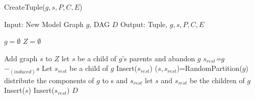 

\begin{algorithm}
\caption{CreateTuple($g,s,P,C,E$)} 
\label{alg:alg102}
\begin{algorithmic}
\STATE Input: New Model Graph $g$, DAG $D$
\STATE Output: Tuple, $g,s,P,C,E$
\end{algorithmic}
\begin{algorithmic}[1]
\STATE $g = \emptyset$
\STATE $Z= \emptyset$

\STATE Add graph $s$ to $Z$ 
\ENDIF
\ENDFOR
{} 
\STATE let $s$ be a child of $g$'s parents and abandon $g$
\RETURN
\ELSE
{}
\STATE \emph{$s_{rest}$=$g$ $-_{(induced)} s$}
\STATE Let \emph{$s_{rest}$} be a child of \emph{$g$}
\STATE Insert($s_{rest}$)
\RETURN
\ENDIF
\ENDFOR
\ENDIF
\ENDWHILE
{}
\STATE ($s,s_{rest}$)=RandomPartition($g$)
\ELSE
\STATE distribute the components of $g$ to s and $s_{rest}$
\ENDIF
\STATE let $s$ and $s_{rest}$ be the children of $g$
\STATE Insert($s$)
\STATE Insert($s_{rest}$) 
\ENDIF
\RETURN $D$

\end{algorithmic}
\end{algorithm}



